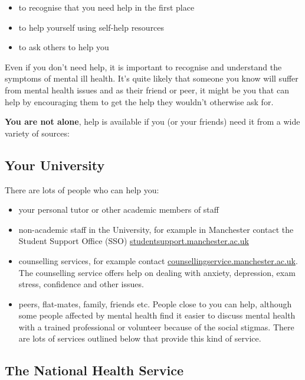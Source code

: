 \documentclass[
]{book}
\providecommand{\tightlist}{%
  \setlength{\itemsep}{0pt}\setlength{\parskip}{0pt}}
\begin{document}
\begin{itemize}
\tightlist
\item
  to recognise that you need help in the first place
\item
  to help yourself using self-help resources
\item
  to ask others to help you
\end{itemize}

Even if you don't need help, it is important to recognise and understand the symptoms of mental ill health. It's quite likely that someone you know will suffer from mental health issues and as their friend or peer, it might be you that can help by encouraging them to get the help they wouldn't otherwise ask for.

\textbf{You are not alone}, help is available if you (or your friends) need it from a wide variety of sources:

\hypertarget{unihelp}{%
\subsection{Your University}\label{unihelp}}

There are lots of people who can help you:

\begin{itemize}
\tightlist
\item
  your personal tutor or other academic members of staff
\item
  non-academic staff in the University, for example in Manchester contact the Student Support Office (SSO) \href{https://www.studentsupport.manchester.ac.uk/}{studentsupport.manchester.ac.uk}
\item
  counselling services, for example contact \href{https://www.counsellingservice.manchester.ac.uk/}{counsellingservice.manchester.ac.uk}. The counselling service offers help on dealing with anxiety, depression, exam stress, confidence and other issues.
\item
  peers, flat-mates, family, friends etc. People close to you can help, although some people affected by mental health find it easier to discuss mental health with a trained professional or volunteer because of the social stigmas. There are lots of services outlined below that provide this kind of service.
\end{itemize}

\hypertarget{nhs}{%
\subsection{The National Health Service}\label{nhs}}
\end{document}
